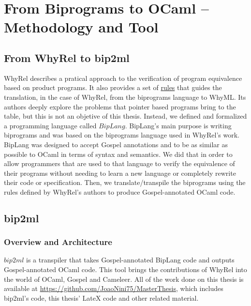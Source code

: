 
%

\chapter{From Biprograms to OCaml -- Methodology and Tool}
\label{cha:methodology}


\FloatBarrier
\section{From WhyRel to bip2ml}
\label{sec:whyrel_to_bip2ml}

WhyRel describes a pratical approach to the verification of program equivalence based on product programs.
It also provides a set of \hyperref[fig:translation-biprograms-rules]{rules} that guides the translation, in the case of WhyRel, from the biprograms language to WhyML.
Its authors deeply explore the problems that pointer based programs bring to the table, but this is not an objetive of this thesis.
Instead, we defined and formalized a programming language called $BipLang$.
BipLang's main purpose is writing biprograms and was based on the biprograms language used in WhyRel's work.
BipLang was designed to accept Gospel annotations and to be as similar as possible to OCaml in terms of syntax and semantics.
We did that in order to allow programmers that are used to that language to verify the equivalence of their programs without needing to learn a new language or completely rewrite their code or specification.
Then, we translate/transpile the biprograms using the rules defined by WhyRel's authors to produce Gospel-annotated OCaml code.


\FloatBarrier
\section{bip2ml}
\label{sec:bip2ml}

\FloatBarrier
\subsection{Overview and Architecture}
\label{subsec:bip2ml_overview}

$bip2ml$ is a transpiler that takes Gospel-annotated BipLang code and outputs Gospel-annotated OCaml code.
This tool brings the contributions of WhyRel into the world of OCaml, Gospel and Cameleer.
All of the work done on this thesis is available at \url{https://github.com/JoaoNini75/MasterThesis}, which includes bip2ml's code, this thesis' LateX code and other related material.

